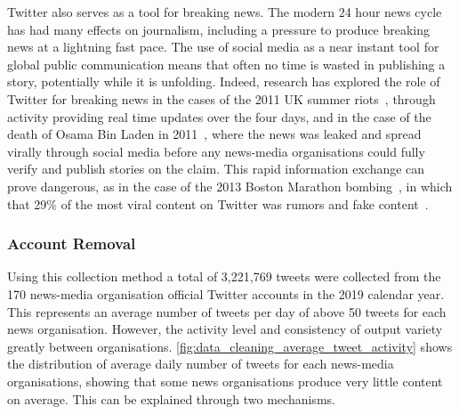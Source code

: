 Twitter also serves as a tool for breaking news. The modern 24 hour news cycle has had many effects on journalism, including a pressure to produce breaking news at a lightning fast pace. The use of social media as a near instant tool for global public communication means that often no time is wasted in publishing a story, potentially while it is unfolding. Indeed, research has explored the role of Twitter for breaking news in the cases of the 2011 UK summer riots~\cite{vis_Twitter_2013}, through activity providing real time updates over the four days, and in the case of the death of Osama Bin Laden in 2011~\cite{hu_breaking_2012}, where the news was leaked and spread virally through social media before any news-media organisations could fully verify and publish stories on the claim. %
This rapid information exchange can prove dangerous, as in the case of the 2013 Boston Marathon bombing~\cite{starbird_rumors_2014}, in which that 29\% of the most viral content on Twitter was rumors and fake content~\cite{gupta_100_2013}.

\subsubsection{Account Removal}
Using this collection method a total of 3,221,769 tweets were collected from the 170 news-media organisation official Twitter accounts in the 2019 calendar year. This represents an average number of tweets per day of above 50 tweets for each news organisation. However, the activity level and consistency of output variety greatly between organisations. \autoref{fig:data_cleaning_average_tweet_activity} shows the distribution of average daily number of tweets for each news-media organisations, showing that some news organisations produce very little content on average. This can be explained through two mechanisms.

